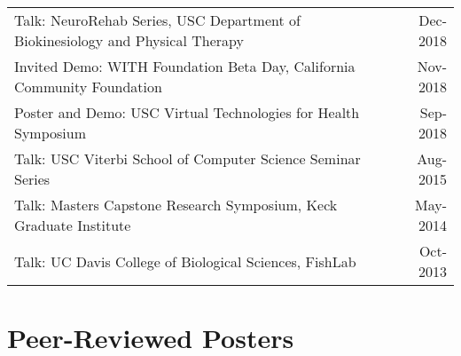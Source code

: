 \documentclass[10pt,a4paper]{article}
\begin{document}
  \vspace*{1mm}\noindent\begin{tabularx}{17cm}{X r}
  Talk: NeuroRehab Series, USC Department of Biokinesiology and Physical Therapy & Dec-2018\\%
    Invited Demo: WITH Foundation Beta Day, California Community Foundation & Nov-2018\\
    Poster and Demo: USC Virtual Technologies for Health Symposium & Sep-2018 \\
    Talk: USC Viterbi School of Computer Science Seminar Series & Aug-2015 \\
    Talk: Masters Capstone Research Symposium, Keck Graduate Institute & May-2014 \\
    Talk: UC Davis College of Biological Sciences, FishLab & Oct-2013 \\
  \end{tabularx}

\vspace*{2mm}\section*{Peer-Reviewed Posters}
\end{document}

